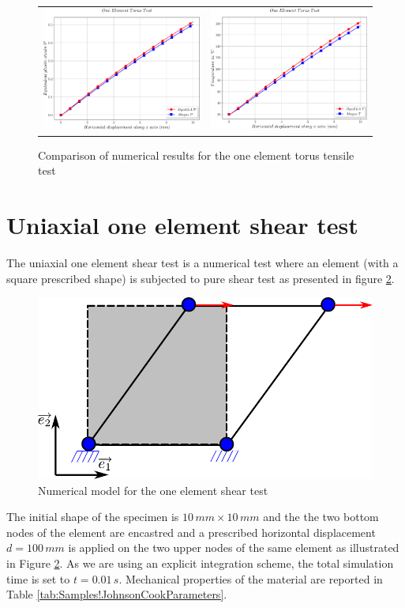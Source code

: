 \begin{figure}[h]
\begin{centering}
\begin{tabular}{cc}
\includegraphics[width=0.45\columnwidth]{Figures/Samples/Element/Torus_plasticStrain} & \includegraphics[width=0.45\columnwidth]{Figures/Samples/Element/Torus_temperature}\tabularnewline
\end{tabular}
\par\end{centering}
\caption{Comparison of numerical results for the one element torus tensile
test\label{fig:Samples!Single!Torus-Comparison}}
\end{figure}
\clearpage

\section{Uniaxial one element shear test}

The uniaxial one element shear test is a numerical test where an element
(with a square prescribed shape) is subjected to pure shear test as
presented in figure \ref{fig:Samples!Single!Shear}.
\begin{figure}[h]
\begin{centering}
\includegraphics[width=0.5\columnwidth]{Figures/SamplesSingleShear}
\par\end{centering}
\caption{Numerical model for the one element shear test\label{fig:Samples!Single!Shear}}
\end{figure}
 The initial shape of the specimen is $10\,mm\times10\,mm$ and the
the two bottom nodes of the element are encastred and a prescribed
horizontal displacement $d=100\,mm$ is applied on the two upper nodes
of the same element as illustrated in Figure \ref{fig:Samples!Single!Shear}.
As we are using an explicit integration scheme, the total simulation
time is set to $t=0.01\,s$. Mechanical properties of the material
are reported in Table \ref{tab:Samples!JohnsonCookParameters}.


